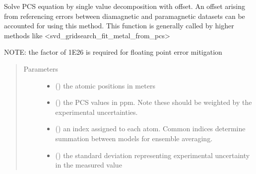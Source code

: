 \documentclass[a4paper,10pt,english,openany,oneside]{sphinxmanual}
\begin{document}
\begin{fulllineitems}
\label{\detokenize{reference/generated/paramagpy.fit.svd_calc_metal_from_pcs_offset:paramagpy.fit.svd_calc_metal_from_pcs_offset}}
\sphinxAtStartPar
Solve PCS equation by single value decomposition with offset.
An offset arising from referencing errors between diamagnetic
and paramagnetic datasets can be accounted for using this method.
This function is generally called by higher methods like
\textless{}svd\_gridsearch\_fit\_metal\_from\_pcs\textgreater{}

\sphinxAtStartPar
NOTE: the factor of 1E26 is required for floating point error mitigation
\begin{quote}\begin{description}
\item[{Parameters}] \leavevmode\begin{itemize}
\item {} 
\sphinxAtStartPar
{} (\sphinxstyleliteralemphasis{\sphinxupquote{ {[}}}\sphinxstyleliteralemphasis{\sphinxupquote{,}}\sphinxstyleliteralemphasis{\sphinxupquote{,}}\sphinxstyleliteralemphasis{\sphinxupquote{{]} }}) \textendash{} the atomic positions in meters

\item {} 
\sphinxAtStartPar
{} () \textendash{} the PCS values in ppm. Note these should be weighted by the
experimental uncertainties.

\item {} 
\sphinxAtStartPar
{} () \textendash{} an index assigned to each atom. Common indices determine summation
between models for ensemble averaging.

\item {} 
\sphinxAtStartPar
{} () \textendash{} the standard deviation representing experimental uncertainty
in the measured value


\end{itemize}
\end{description}
\end{quote}
\end{fulllineitems}
\end{document}
